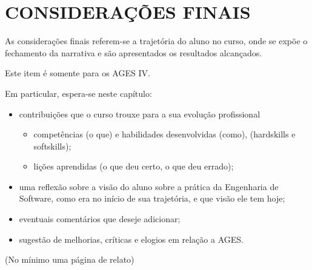 \chapter[Considerações Finais]{CONSIDERAÇÕES FINAIS}

As considerações finais referem-se a trajetória do aluno no curso, onde se
expõe o fechamento da narrativa e são apresentados os resultados alcançados.

Este item é somente para os AGES IV.\

Em particular, espera-se neste capítulo:
\begin{itemize}
  \item{contribuições que o curso trouxe para a sua evolução profissional} 
  \begin{itemize}
    \item competências (o que) e habilidades desenvolvidas (como),
    (hardskills e softskills);
    \item lições aprendidas (o que deu certo, o que deu errado);
  \end{itemize}
  
  \item uma reflexão sobre a visão do aluno sobre a prática da Engenharia de
Software, como era no início de sua trajetória, e que visão ele tem hoje;
  
  \item eventuais comentários que deseje adicionar;
  
  \item sugestão de melhorias, críticas e elogios em relação a AGES.\
\end{itemize}

(No mínimo uma página de relato)